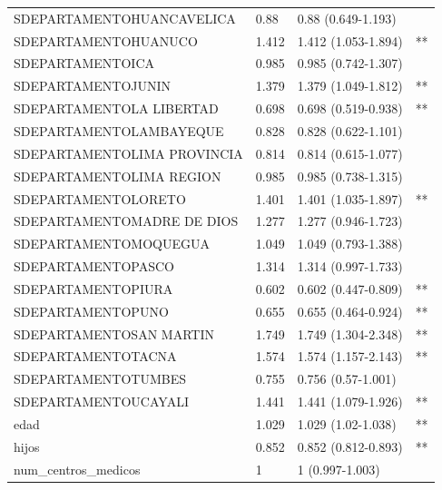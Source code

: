 \begin{tabular}{llll}
  SDEPARTAMENTOHUANCAVELICA & 0.88 & 0.88 (0.649-1.193) &  \\ 
  SDEPARTAMENTOHUANUCO & 1.412 & 1.412 (1.053-1.894) & ** \\ 
  SDEPARTAMENTOICA & 0.985 & 0.985 (0.742-1.307) &  \\ 
  SDEPARTAMENTOJUNIN & 1.379 & 1.379 (1.049-1.812) & ** \\ 
  SDEPARTAMENTOLA LIBERTAD & 0.698 & 0.698 (0.519-0.938) & ** \\ 
  SDEPARTAMENTOLAMBAYEQUE & 0.828 & 0.828 (0.622-1.101) &  \\ 
  SDEPARTAMENTOLIMA PROVINCIA & 0.814 & 0.814 (0.615-1.077) &  \\ 
  SDEPARTAMENTOLIMA REGION & 0.985 & 0.985 (0.738-1.315) &  \\ 
  SDEPARTAMENTOLORETO & 1.401 & 1.401 (1.035-1.897) & ** \\ 
  SDEPARTAMENTOMADRE DE DIOS & 1.277 & 1.277 (0.946-1.723) &  \\ 
  SDEPARTAMENTOMOQUEGUA & 1.049 & 1.049 (0.793-1.388) &  \\ 
  SDEPARTAMENTOPASCO & 1.314 & 1.314 (0.997-1.733) &  \\ 
  SDEPARTAMENTOPIURA & 0.602 & 0.602 (0.447-0.809) & ** \\ 
  SDEPARTAMENTOPUNO & 0.655 & 0.655 (0.464-0.924) & ** \\ 
  SDEPARTAMENTOSAN MARTIN & 1.749 & 1.749 (1.304-2.348) & ** \\ 
  SDEPARTAMENTOTACNA & 1.574 & 1.574 (1.157-2.143) & ** \\ 
  SDEPARTAMENTOTUMBES & 0.755 & 0.756 (0.57-1.001) &  \\ 
  SDEPARTAMENTOUCAYALI & 1.441 & 1.441 (1.079-1.926) & ** \\ 
  edad & 1.029 & 1.029 (1.02-1.038) & ** \\ 
  hijos & 0.852 & 0.852 (0.812-0.893) & ** \\ 
  num\_centros\_medicos & 1 & 1 (0.997-1.003) &  \\ 
   \bottomrule
\end{tabular}
